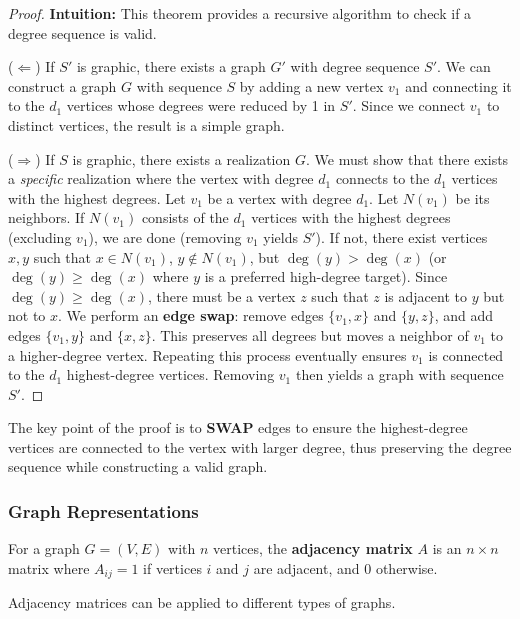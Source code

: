 \documentclass[oneside]{book}
\begin{document}
\begin{proof}
\textbf{Intuition:} This theorem provides a recursive algorithm to check if a degree sequence is valid.

($\Leftarrow$) If $S'$ is graphic, there exists a graph $G'$ with degree sequence $S'$. We can construct a graph $G$ with sequence $S$ by adding a new vertex $v_1$ and connecting it to the $d_1$ vertices whose degrees were reduced by 1 in $S'$. Since we connect $v_1$ to distinct vertices, the result is a simple graph.

($\Rightarrow$) If $S$ is graphic, there exists a realization $G$. We must show that there exists a \textit{specific} realization where the vertex with degree $d_1$ connects to the $d_1$ vertices with the highest degrees.
Let $v_1$ be a vertex with degree $d_1$. Let $N(v_1)$ be its neighbors. If $N(v_1)$ consists of the $d_1$ vertices with the highest degrees (excluding $v_1$), we are done (removing $v_1$ yields $S'$).
If not, there exist vertices $x, y$ such that $x \in N(v_1)$, $y \notin N(v_1)$, but $\deg(y) > \deg(x)$ (or $\deg(y) \ge \deg(x)$ where $y$ is a preferred high-degree target).
Since $\deg(y) \ge \deg(x)$, there must be a vertex $z$ such that $z$ is adjacent to $y$ but not to $x$.
We perform an \textbf{edge swap}: remove edges $\{v_1, x\}$ and $\{y, z\}$, and add edges $\{v_1, y\}$ and $\{x, z\}$.
This preserves all degrees but moves a neighbor of $v_1$ to a higher-degree vertex. Repeating this process eventually ensures $v_1$ is connected to the $d_1$ highest-degree vertices. Removing $v_1$ then yields a graph with sequence $S'$.
\end{proof}

The key point of the proof is to \textbf{SWAP} edges to ensure the highest-degree vertices are connected to the vertex with larger degree, thus preserving the degree sequence while constructing a valid graph.

\subsubsection{Graph Representations}

\begin{definition}
For a graph $G = (V, E)$ with $n$ vertices, the \textbf{adjacency matrix} $A$ is an $n \times n$ matrix where $A_{ij} = 1$ if vertices $i$ and $j$ are adjacent, and $0$ otherwise.
\end{definition}

Adjacency matrices can be applied to different types of graphs.
\end{document}
